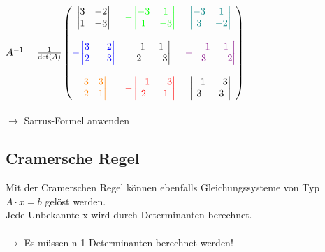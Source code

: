 			$A^{-1} = \frac{1}{\det(A)} \begin{pmatrix}
			\begin{vmatrix}	3 & -2 \\ 1 & -3 \end{vmatrix} & \textcolor{green}{- \begin{vmatrix}	-3 & 1 \\ 1 & -3 \end{vmatrix}} & \textcolor{teal}{\begin{vmatrix}	-3 & 1 \\ 3 & -2 \end{vmatrix}} \\
			\\
			\textcolor{blue}{- \begin{vmatrix}	3 & -2 \\ 2 & -3 \end{vmatrix}} & \begin{vmatrix}	-1 & 1 \\ 2 & -3 \end{vmatrix} & 	\textcolor{violet}{- \begin{vmatrix}	-1 & 1 \\ 3 & -2 \end{vmatrix}} \\
			\\
			\textcolor{orange}{\begin{vmatrix}	3 & 3 \\ 2 & 1 \end{vmatrix}} & \textcolor{red}{- \begin{vmatrix}	-1 & -3 \\ 2 & 1 \end{vmatrix}} & \begin{vmatrix}	-1 & -3 \\ 3 & 3 \end{vmatrix} 
									\end{pmatrix}$ \\ \\
				$\rightarrow$ Sarrus-Formel anwenden \\
										
		    
		    \subsection{Cramersche Regel}
			Mit der Cramerschen Regel können ebenfalls Gleichungssysteme von Typ $A \cdot x = b$ gelöst werden. \\
			Jede Unbekannte x wird durch Determinanten berechnet. \\
			\\
			$\rightarrow$ Es müssen n-1 Determinanten berechnet werden!	 \\

